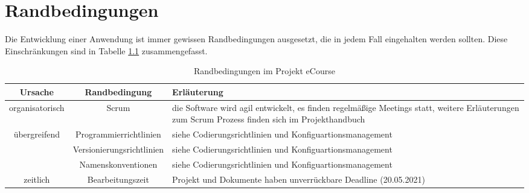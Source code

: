 
\chapter{Randbedingungen}
Die Entwicklung einer Anwendung ist immer gewissen Randbedingungen ausgesetzt, die in jedem Fall eingehalten werden sollten. Diese Einschränkungen sind in Tabelle \ref{tab:Randbedingungen} zusammengefasst. 

\begin{table}[H]
\centering
\begin{tabularx}{\textwidth}[H]{|c|c|X|}
\hline
Ursache & Randbedingung & Erläuterung\\
\hline
organisatorisch & Scrum & die Software wird agil entwickelt, es finden regelmäßige Meetings statt, weitere Erläuterungen zum Scrum Prozess finden sich im Projekthandbuch \\
\hline
übergreifend & Programmierrichtlinien & siehe Codierungsrichtlinien und Konfiguartionsmanagement \\
\hline
\quad & Versionierungsrichtlinien & siehe Codierungsrichtlinien und Konfiguartionsmanagement \\
\hline
\quad & Namenskonventionen & siehe Codierungsrichtlinien und Konfiguartionsmanagement \\
\hline
zeitlich & Bearbeitungszeit & Projekt und Dokumente haben unverrückbare Deadline (20.05.2021)\\
\hline
\end{tabularx}
\caption{Randbedingungen im Projekt eCourse}
\label{tab:Randbedingungen}
\end{table}
